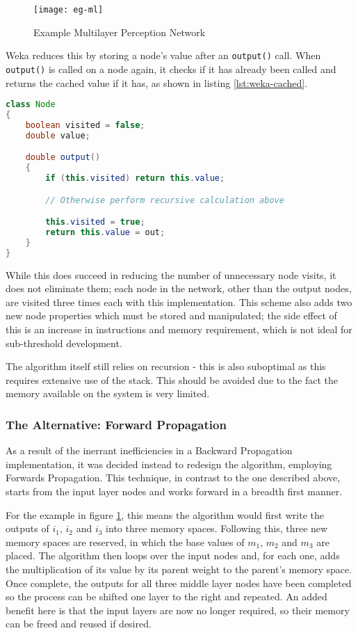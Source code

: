 \begin{figure}
    \centering
    \texttt{[image: eg-ml]}
    \caption{Example Multilayer Perception Network}
    \label{fig:eg-ml}
\end{figure}

Weka reduces this by storing a node's value after an \verb|output()| call. When \verb|output()| is called on a node again, it checks if it has already been called and returns the cached value if it has, as shown in listing \ref{lst:weka-cached}.

\clearpage
\begin{lstlisting}[language=Java,caption={Weka's method of preventing repeated calculations},label={lst:weka-cached}]
class Node
{
    boolean visited = false;
    double value;

    double output()
    {
        if (this.visited) return this.value;

        // Otherwise perform recursive calculation above

        this.visited = true;
        return this.value = out;
    }
}
\end{lstlisting}

While this does succeed in reducing the number of unnecessary node visits, it does not eliminate them; each node in the network, other than the output nodes, are visited three times each with this implementation. This scheme also adds two new node properties which must be stored and manipulated; the side effect of this is an increase in instructions and memory requirement, which is not ideal for sub-threshold development.

The algorithm itself still relies on recursion - this is also suboptimal as this requires extensive use of the stack. This should be avoided due to the fact the memory available on the system is very limited.

\subsubsection{The Alternative: Forward Propagation}

As a result of the inerrant inefficiencies in a Backward Propagation implementation, it was decided instead to redesign the algorithm, employing Forwards Propagation. This technique, in contrast to the one described above, starts from the input layer nodes and works forward in a breadth first manner.

For the example in figure \ref{fig:eg-ml}, this means the algorithm would first write the outputs of $i_1$, $i_2$ and $i_3$ into three memory spaces. Following this, three new memory spaces are reserved, in which the base values of $m_1$, $m_2$ and $m_3$ are placed. The algorithm then loops over the input nodes and, for each one, adds the multiplication of its value by its parent weight to the parent's memory space. Once complete, the outputs for all three middle layer nodes have been completed so the process can be shifted one layer to the right and repeated. An added benefit here is that the input layers are now no longer required, so their memory can be freed and reused if desired.

